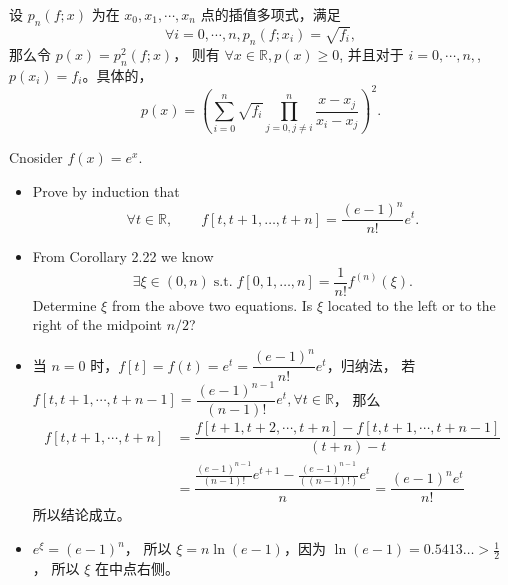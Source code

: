 \documentclass[lang=cn,a4paper,newtx,bibend=bibtex]{elegantpaper}
\begin{document}
\begin{solution}
设 $p_n(f; x)$ 为在 $x_0, x_1, \cdots, x_n$ 点的插值多项式，满足
\[\forall i = 0, \cdots, n, p_n(f; x_i) = \sqrt{f_i},\]
那么令 $p(x) = p_n^2(f; x)$， 则有 $\forall x \in \mathbb{R}, p(x) \ge 0$, 并且对于 $i = 0, \cdots, n, $, $p(x_i) = f_i$。具体的，
\[
  p(x) = \left(\sum_{i = 0}^n \sqrt{f_i} \prod_{j = 0, j \neq i}^n \dfrac{x - x_j}{x_i - x_j}\right)^2.
\]
\end{solution}

\begin{prob}
Cnosider $f(x)=e^x$.
  \begin{itemize}
    \item Prove by induction that
    \begin{equation*}
      \forall t\in \mathbb{R}, \qquad f[t,t+1,\ldots,t+n]=\frac{(e-1)^n}{n!}e^t.
    \end{equation*}
    \item From Corollary 2.22 we know
    \begin{equation*}
      \exists \xi\in(0,n) \; \text{s.t.} \; f[0,1,\ldots,n]=\frac{1}{n!}f^{(n)}(\xi).
    \end{equation*}
    Determine $\xi$ from the above two equations. Is $\xi$ located to the left 
    or to the right of the midpoint $n/2$?
  \end{itemize}
\end{prob}

\begin{solution}
\begin{itemize}
  \item 当 $n = 0$ 时，$f[t] = f(t) = e^t = \dfrac{(e - 1)^n}{n!}e^t$，归纳法，
若 $f[t, t + 1, \cdots, t + n - 1] = \dfrac{(e - 1)^{n - 1}}{(n - 1)!} e^t, \forall t \in \mathbb{R}$，
那么
\begin{equation*}
\begin{aligned}
  f[t, t + 1, \cdots, t + n] &= \dfrac{f[t + 1, t + 2, \cdots, t + n] - f[t, t + 1, \cdots, t + n - 1]}{(t + n) - t} \\
  &=\dfrac{\frac{(e - 1)^{n - 1}}{(n - 1)!}e^{t + 1} - \frac{(e - 1)^{n - 1}}{((n - 1)!)}e^t}{n} = \dfrac{(e - 1)^n e^t}{n!}
\end{aligned}
\end{equation*}
所以结论成立。
\item $e^{\xi} = (e - 1)^n$， 所以 $\xi = n \ln (e - 1)$，因为 $\ln(e - 1)= 0.5413\ldots > \frac12$， 所以 $\xi$ 在中点右侧。
\end{itemize}
\end{solution}
\end{document}
